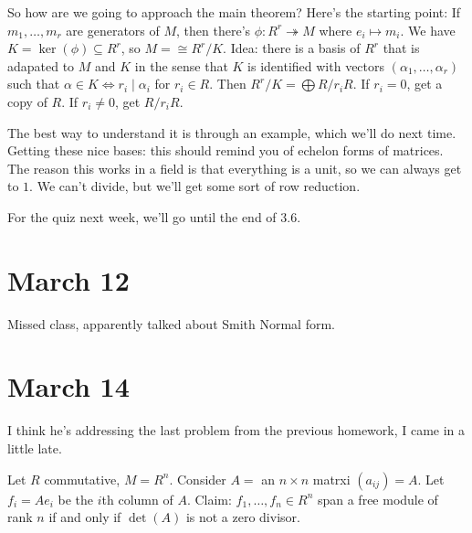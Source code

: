 \documentclass{article}
\theoremstyle{plain}
\theoremstyle{remark}
\begin{document}
So how are we going to approach the main theorem?
Here's the starting point:
If $m_1,\dots,m_r$ are generators of $M$, then
there's $\phi \colon R^r \twoheadrightarrow M$
where $e_i \mapsto m_i$.
We have $K = \ker(\phi) \subseteq R^r$,
so $M = \cong R^r/K$.
Idea: there is a basis of $R^r$ that is adapated to $M$ and $K$
in the sense that $K$ is identified with vectors $(\alpha_1,\dots,\alpha_r)$
such that $\alpha \in K \iff r_i \mid \alpha_i$ for $r_i \in R$.
Then $R^r/K = \bigoplus R/r_iR$.
If $r_i = 0$, get a copy of $R$.
If $r_i \neq 0$, get $R/r_iR$.

The best way to understand it is through an example,
which we'll do next time.
Getting these nice bases: this should remind you of echelon forms of matrices.
The reason this works in a field is that everything is a unit,
so we can always get to $1$.
We can't divide, but we'll get some sort of row reduction.

For the quiz next week, we'll go until the end of 3.6.


\section{March 12}
Missed class, apparently talked about Smith Normal form.


\section{March 14}
I think he's addressing the last problem from the previous homework,
I came in a little late.

Let $R$ commutative, $M = R^n$.
Consider $A =$ an $n \times n$ matrxi $(a_{ij}) = A$.
Let $f_i = Ae_i$ be the $i$th column of $A$.
Claim: $f_1,\dots,f_n \in R^n$ span a free module of rank $n$
if and only if $\det(A)$ is not a zero divisor.
\end{document}
